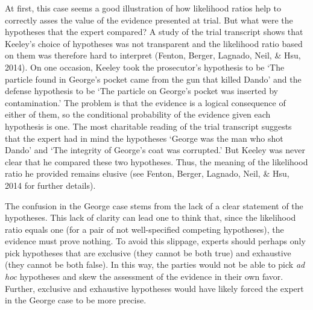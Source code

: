 \documentclass[
  10pt,
  dvipsnames,enabledeprecatedfontcommands]{scrartcl}
\begin{document}
At first, this case seems a good illustration of how likelihood ratios
help to correctly asses the value of the evidence presented at trial.
But what were the hypotheses that the expert compared? A study of the
trial transcript shows that Keeley's choice of hypotheses was not
transparent and the likelihood ratio based on them was therefore hard to
interpret (Fenton, Berger, Lagnado, Neil, \& Hsu, 2014). On one
occasion, Keeley took the prosecutor's hypothesis to be `The particle
found in George's pocket came from the gun that killed Dando' and the
defense hypothesis to be `The particle on George's pocket was inserted
by contamination.' The problem is that the evidence is a logical
consequence of either of them, so the conditional probability of the
evidence given each hypothesis is one. The most charitable reading of
the trial transcript suggests that the expert had in mind the hypotheses
`George was the man who shot Dando' and `The integrity of George's coat
was corrupted.' But Keeley was never clear that he compared these two
hypotheses. Thus, the meaning of the likelihood ratio he provided
remains elusive (see Fenton, Berger, Lagnado, Neil, \& Hsu, 2014 for
further details).

The confusion in the George case stems from the lack of a clear
statement of the hypotheses. This lack of clarity can lead one to think
that, since the likelihood ratio equals one (for a pair of not
well-specified competing hypotheses), the evidence must prove nothing.
To avoid this slippage, experts should perhaps only pick hypotheses that
are exclusive (they cannot be both true) and exhaustive (they cannot be
both false). In this way, the parties would not be able to pick
\textit{ad hoc} hypotheses and skew the assessment of the evidence in
their own favor. Further, exclusive and exhaustive hypotheses would have
likely forced the expert in the George case to be more precise.
\end{document}
